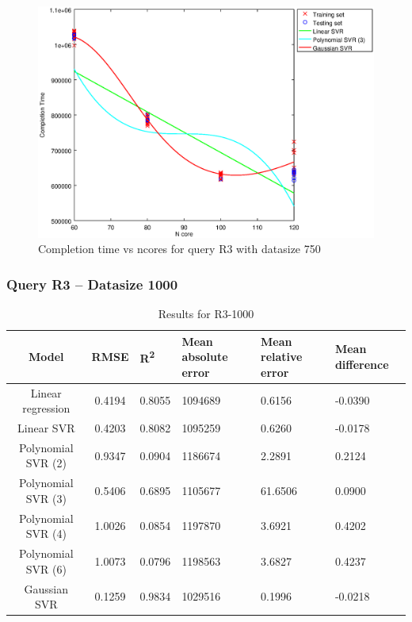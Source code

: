 \documentclass[a4paper,11pt]{article}
\begin{document}
\begin {figure}[hbtp]
\centering
\includegraphics[width=\textwidth]{output/R3_750_ONLY_1_LINEAR_NCORE/plot_R3_750_bestmodels.eps}
\caption{Completion time vs ncores for query R3 with datasize 750}
\label{fig:coreonly_linear_R3_750}
\end {figure}

\newpage
\subsubsection{Query R3 -- Datasize 1000}
\begin{table}[H]
	\centering
	\begin{adjustbox}{center}
		\begin{tabular}{c | c M{1.2cm} M{2.5cm} M{2.5cm} M{1.8cm}}
			Model & RMSE & R\textsuperscript{2} & Mean absolute error & Mean relative error & Mean difference \tabularnewline
			\hline
			Linear regression & 0.4194 & 0.8055 & 1094689 & 0.6156 & -0.0390 \\
			Linear SVR & 0.4203 & 0.8082 & 1095259 & 0.6260 & -0.0178 \\
			Polynomial SVR (2) & 0.9347 & 0.0904 & 1186674 & 2.2891 & 0.2124 \\
			Polynomial SVR (3) & 0.5406 & 0.6895 & 1105677 & 61.6506 & 0.0900 \\
			Polynomial SVR (4) & 1.0026 & 0.0854 & 1197870 & 3.6921 & 0.4202 \\
			Polynomial SVR (6) & 1.0073 & 0.0796 & 1198563 & 3.6827 & 0.4237 \\
			Gaussian SVR & 0.1259 & 0.9834 & 1029516 & 0.1996 & -0.0218 \\
		\end{tabular}
	\end{adjustbox}
	\\
	\caption{Results for R3-1000}
	\label{fig:coreonly_linear_R3_1000}
\end{table}
\end{document}
